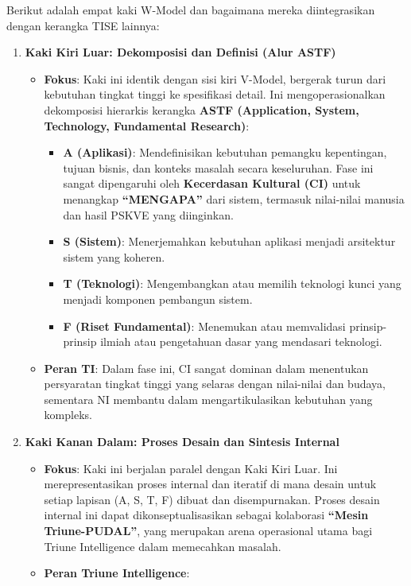 \documentclass[
  letterpaper,
  DIV=11,
  numbers=noendperiod]{scrreprt}
\providecommand{\tightlist}{%
  \setlength{\itemsep}{0pt}\setlength{\parskip}{0pt}}
\begin{document}
Berikut adalah empat kaki W-Model dan bagaimana mereka diintegrasikan
dengan kerangka TISE lainnya:

\begin{enumerate}
\def\labelenumi{\arabic{enumi}.}
\tightlist
\item
  \textbf{Kaki Kiri Luar: Dekomposisi dan Definisi (Alur ASTF)}

  \begin{itemize}
  \tightlist
  \item
    \textbf{Fokus}: Kaki ini identik dengan sisi kiri V-Model, bergerak
    turun dari kebutuhan tingkat tinggi ke spesifikasi detail. Ini
    mengoperasionalkan dekomposisi hierarkis kerangka \textbf{ASTF
    (Application, System, Technology, Fundamental Research)}:

    \begin{itemize}
    \tightlist
    \item
      \textbf{A (Aplikasi)}: Mendefinisikan kebutuhan pemangku
      kepentingan, tujuan bisnis, dan konteks masalah secara
      keseluruhan. Fase ini sangat dipengaruhi oleh \textbf{Kecerdasan
      Kultural (CI)} untuk menangkap \textbf{``MENGAPA''} dari sistem,
      termasuk nilai-nilai manusia dan hasil PSKVE yang diinginkan.
    \item
      \textbf{S (Sistem)}: Menerjemahkan kebutuhan aplikasi menjadi
      arsitektur sistem yang koheren.
    \item
      \textbf{T (Teknologi)}: Mengembangkan atau memilih teknologi kunci
      yang menjadi komponen pembangun sistem.
    \item
      \textbf{F (Riset Fundamental)}: Menemukan atau memvalidasi
      prinsip-prinsip ilmiah atau pengetahuan dasar yang mendasari
      teknologi.
    \end{itemize}
  \item
    \textbf{Peran TI}: Dalam fase ini, CI sangat dominan dalam
    menentukan persyaratan tingkat tinggi yang selaras dengan
    nilai-nilai dan budaya, sementara NI membantu dalam
    mengartikulasikan kebutuhan yang kompleks.
  \end{itemize}
\item
  \textbf{Kaki Kanan Dalam: Proses Desain dan Sintesis Internal}

  \begin{itemize}
  \tightlist
  \item
    \textbf{Fokus}: Kaki ini berjalan paralel dengan Kaki Kiri Luar. Ini
    merepresentasikan proses internal dan iteratif di mana desain untuk
    setiap lapisan (A, S, T, F) dibuat dan disempurnakan. Proses desain
    internal ini dapat dikonseptualisasikan sebagai kolaborasi
    \textbf{``Mesin Triune-PUDAL''}, yang merupakan arena operasional
    utama bagi Triune Intelligence dalam memecahkan masalah.
  \item
    \textbf{Peran Triune Intelligence}:


\end{itemize}
\end{enumerate}
\end{document}
